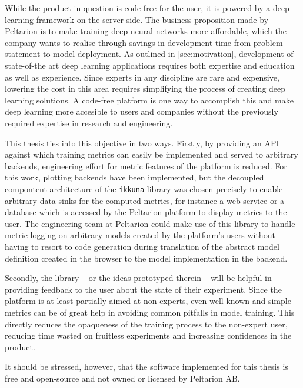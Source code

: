 While the product in question is code-free for the user, it is powered by a deep
learning framework on the server side. The business proposition made by
Peltarion is to make training deep neural networks more affordable, which the
company wants to realise through savings in development time from problem
statement to model deployment. As outlined in \cref{sec:motivation}, development
of state-of-the art deep learning applications requires both expertise and
education as well as experience. Since experts in any discipline are rare and
expensive, lowering the cost in this area requires simplifying the process of
creating deep learning solutions. A code-free platform is one way to accomplish
this and make deep learning more accesible to users and companies without the
previously required expertise in research and engineering.

This thesis ties into this objective in two ways. Firstly, by providing an API against
which training metrics can easily be implemented and served to arbitrary
backends, engineering effort for metric features of the platform is reduced. For
this work, plotting backends have been implemented, but the decoupled compontent
architecture of the \texttt{ikkuna} library was chosen precisely to enable
arbitrary data sinks for the computed metrics, for instance a web service or a
database which is accessed by the Peltarion platform to display metrics to the
user. The engineering team at Peltarion could make use of this library to handle
metric logging on arbitrary models created by the platform's users without
having to resort to code generation during translation of the abstract model
definition created in the browser to the model implementation in the backend.

Secondly, the library -- or the ideas prototyped therein -- will be helpful in
providing feedback to the user about the state of their experiment. Since the
platform is at least partially aimed at non-experts, even well-known and simple
metrics can be of great help in avoiding common pitfalls in model training. This
directly reduces the opaqueness of the training process to the non-expert user,
reducing time wasted on fruitless experiments and increasing confidences in the
product.

It should be stressed, however, that the software implemented for this thesis is
free and open-source and not owned or licensed by Peltarion AB.

